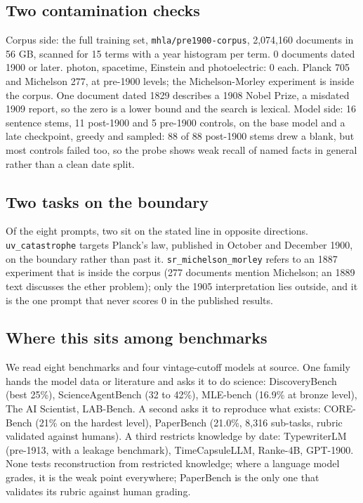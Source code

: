 
\subsection{Two contamination checks}

Corpus side: the full training set, \texttt{mhla/pre1900-corpus}, 2,074,160 documents in 56 GB, scanned for 15 terms with a year histogram per term. 0 documents dated 1900 or later. photon, spacetime, Einstein and photoelectric: 0 each. Planck 705 and Michelson 277, at pre-1900 levels; the Michelson-Morley experiment is inside the corpus. One document dated 1829 describes a 1908 Nobel Prize, a misdated 1909 report, so the zero is a lower bound and the search is lexical. Model side: 16 sentence stems, 11 post-1900 and 5 pre-1900 controls, on the base model and a late checkpoint, greedy and sampled: 88 of 88 post-1900 stems drew a blank, but most controls failed too, so the probe shows weak recall of named facts in general rather than a clean date split.



\subsection{Two tasks on the boundary}

Of the eight prompts, two sit on the stated line in opposite directions. \texttt{uv\_catastrophe} targets Planck's law, published in October and December 1900, on the boundary rather than past it. \texttt{sr\_michelson\_morley} refers to an 1887 experiment that is inside the corpus (277 documents mention Michelson; an 1889 text discusses the ether problem); only the 1905 interpretation lies outside, and it is the one prompt that never scores 0 in the published results.



\subsection{Where this sits among benchmarks}

We read eight benchmarks and four vintage-cutoff models at source. One family hands the model data or literature and asks it to do science: DiscoveryBench (best 25\%), ScienceAgentBench (32 to 42\%), MLE-bench (16.9\% at bronze level), The AI Scientist, LAB-Bench. A second asks it to reproduce what exists: CORE-Bench (21\% on the hardest level), PaperBench (21.0\%, 8,316 sub-tasks, rubric validated against humans). A third restricts knowledge by date: TypewriterLM (pre-1913, with a leakage benchmark), TimeCapsuleLLM, Ranke-4B, GPT-1900. None tests reconstruction from restricted knowledge; where a language model grades, it is the weak point everywhere; PaperBench is the only one that validates its rubric against human grading.

